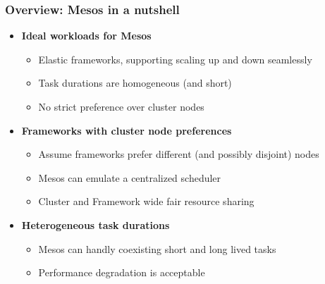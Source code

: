 \begin{frame}
\frametitle{Overview: Mesos in a nutshell}
\begin{itemize}
	\item {\bf Ideal workloads for Mesos}
	\begin{itemize}
		\item Elastic frameworks, supporting scaling up and down seamlessly
		\item Task durations are homogeneous (and short)
		\item No strict preference over cluster nodes
	\end{itemize}

\vspace{20pt}

	\item {\bf Frameworks with cluster node preferences}
	\begin{itemize}
		\item Assume frameworks prefer different (and possibly disjoint) nodes
		\item Mesos can emulate a centralized scheduler
		\item Cluster and Framework wide fair resource sharing
	\end{itemize}

\vspace{20pt}

	\item {\bf Heterogeneous task durations}
	\begin{itemize}
		\item Mesos can handly coexisting short and long lived tasks
		\item Performance degradation is acceptable
	\end{itemize}
\end{itemize}
\end{frame}

